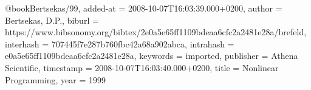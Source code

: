 @book{Bertsekas/99,
	added-at = {2008-10-07T16:03:39.000+0200},
	author = {Bertsekas, D.P.},
	biburl = {https://www.bibsonomy.org/bibtex/2e0a5e65ff1109bdeaa6cfc2a2481e28a/brefeld},
	interhash = {707445f7e287b760fbc42a68a902abca},
	intrahash = {e0a5e65ff1109bdeaa6cfc2a2481e28a},
	keywords = {imported},
	publisher = {Athena Scientific},
	timestamp = {2008-10-07T16:03:40.000+0200},
	title = {Nonlinear Programming},
	year = 1999
}